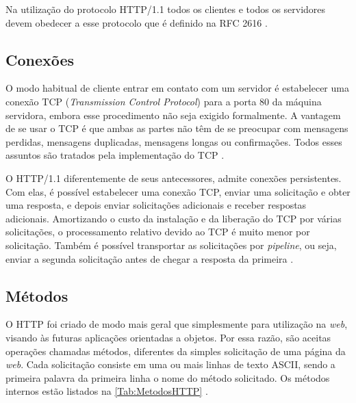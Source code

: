 Na utilização do protocolo HTTP/1.1 todos os clientes e todos os servidores devem obedecer a esse protocolo que é definido na RFC 2616 \cite{Tanenbaum:2003}.

\subsection{Conexões} \label{HTTP/1.1 - HyperText Transfer Protocol}

O modo habitual de cliente entrar em contato com um servidor é estabelecer uma conexão TCP (\textit{Transmission Control Protocol}) para a porta 80 da máquina servidora, embora esse procedimento não seja exigido formalmente. A vantagem de se usar o TCP é que ambas as partes não têm de se preocupar com mensagens perdidas, mensagens duplicadas, mensagens longas ou confirmações. Todos esses assuntos são tratados pela implementação do TCP \cite{Tanenbaum:2003}.

O HTTP/1.1 diferentemente de seus antecessores, admite conexões persistentes. Com elas, é possível estabelecer uma conexão TCP, enviar uma solicitação e obter uma resposta, e depois enviar solicitações adicionais e receber respostas adicionais. Amortizando o custo da instalação e da liberação do TCP por várias solicitações, o processamento relativo devido ao TCP é muito menor por solicitação. Também é possível transportar as solicitações por \textit{pipeline}, ou seja, enviar a segunda solicitação antes de chegar a resposta da primeira \cite{Tanenbaum:2003}.



\subsection{Métodos} \label{subsec:Metodos}

O HTTP foi criado de modo mais geral que simplesmente para utilização na \textit{web}, visando às futuras aplicações orientadas a objetos. Por essa razão, são aceitas operações chamadas métodos, diferentes da simples solicitação de uma página da \textit{web}. Cada solicitação consiste em uma ou mais linhas de texto ASCII, sendo a primeira palavra da primeira linha o nome do método solicitado. Os métodos internos estão listados na \autoref{Tab:MetodosHTTP} \cite{Tanenbaum:2003}.


